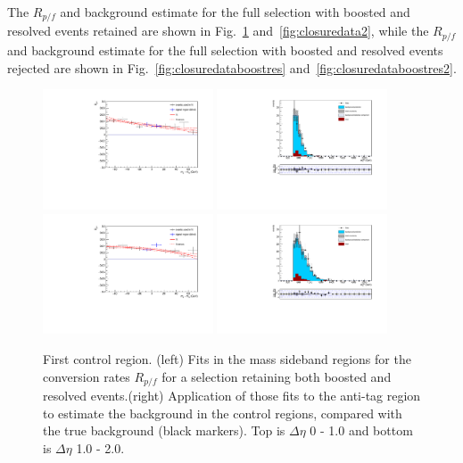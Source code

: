 The $R_{p/f}$ and background estimate for the full selection with boosted and resolved events retained are shown in Fig.~\ref{fig:closuredata} and~\ref{fig:closuredata2}, while the $R_{p/f}$ and background estimate for the full selection with boosted and resolved events rejected are shown in Fig.~\ref{fig:closuredataboostres} and~\ref{fig:closuredataboostres2}.

\begin{figure}[h]
\centering
\includegraphics[width=0.45\textwidth]{F5/HH4b2p1SR_Fit_BG_retain_dEta0_CR1.pdf}
\includegraphics[width=0.45\textwidth]{F5/HH4b2p1_Plot_BG_retain_dEta0_CR1.pdf}\\
\includegraphics[width=0.45\textwidth]{F5/HH4b2p1SR_Fit_BG_retain_dEta1_CR1.pdf}
\includegraphics[width=0.45\textwidth]{F5/HH4b2p1_Plot_BG_retain_dEta1_CR1.pdf}
\caption{First control region. (left) Fits in the mass sideband regions for the conversion rates $R_{p/f}$ for a selection retaining both boosted and resolved events.(right) Application of those fits to the anti-tag region to estimate the background in the control regions, compared with the true background (black markers). Top is $\Delta\eta$ 0 - 1.0 and bottom is $\Delta\eta$ 1.0 - 2.0.}
\label{fig:closuredata}
\end{figure}

